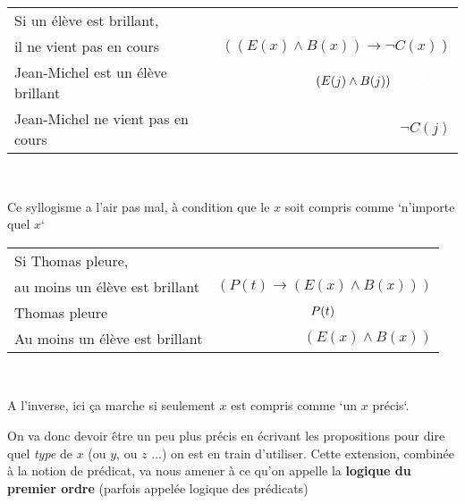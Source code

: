 \begin{frame}
	
	
	\begin{tabular}{lr}
Si un élève est brillant, & \\
il ne vient pas en cours & $((E(x)\wedge B(x)) \rightarrow \neg C(x))$\\
Jean-Michel est un élève brillant& $(E(j)\wedge B(j))\textcolor{white}{\rightarrow \neg Qqzdq}$\\
\hline
Jean-Michel ne vient pas en cours & $\neg C(j)	$\\
\end{tabular}\pause\newline

\textcolor{white}{lol}

Ce syllogisme a l'air pas mal, à condition que le $x$ soit compris comme `n'importe quel $x$`

\end{frame}



\begin{frame}
	

	\begin{tabular}{lr}
Si Thomas pleure, & \\
au moins un élève est brillant & $(P(t) \rightarrow (E(x)\wedge B(x))) $\\
Thomas pleure& $P(t)\textcolor{white}{\rightarrow (E(x)\wedge B(xsk}$\\
\hline
Au moins un élève est brillant & $(E(x) \wedge B(x))	$\\
\end{tabular}\pause\newline

\textcolor{white}{lol}

A l'inverse, ici ça marche si seulement $x$ est compris comme `un $x$ précis`. \pause\newline

On va donc devoir être un peu plus précis en écrivant les propositions pour dire quel \textit{type} de $x$ (ou $y$, ou $z$ ...) on est en train d'utiliser. Cette extension, combinée à la notion de prédicat, va nous amener à ce qu'on appelle la \textbf{logique du premier ordre} (parfois appelée logique des prédicats)

\end{frame}





